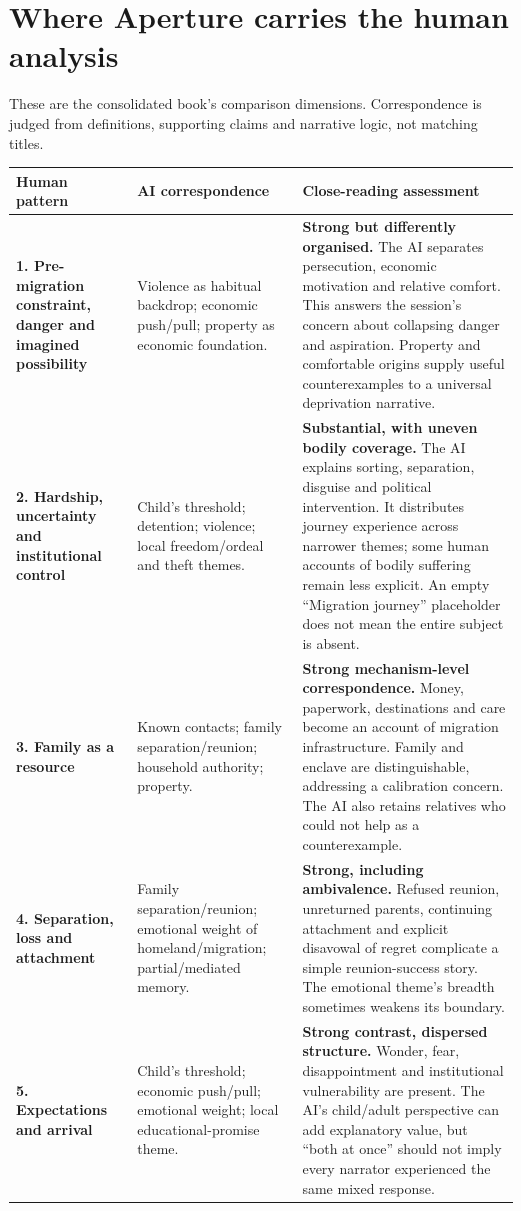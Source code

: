 \documentclass[10pt,a4paper]{article}
\newcommand{\kicker}[1]{{\sffamily\small\bfseries\color{teal}#1}\par\vspace{5pt}}
\newcommand{\page}[2]{\clearpage\kicker{#1}\section*{#2}}
\begin{document}
\page{06 / CANDIDATE PATTERNS, 1--5}{Where Aperture carries the human analysis}
{\small These are the consolidated book's comparison dimensions. Correspondence is judged from definitions, supporting claims and narrative logic, not matching titles.}\par
\begin{tabularx}{\linewidth}{@{}p{3.4cm}YY@{}}
\toprule
\textbf{Human pattern} & \textbf{AI correspondence} & \textbf{Close-reading assessment}\tabularnewline\midrule
\textbf{1. Pre-migration constraint, danger and imagined possibility} & Violence as habitual backdrop; economic push/pull; property as economic foundation. & \textbf{Strong but differently organised.} The AI separates persecution, economic motivation and relative comfort. This answers the session's concern about collapsing danger and aspiration. Property and comfortable origins supply useful counterexamples to a universal deprivation narrative.\tabularnewline\addlinespace
\textbf{2. Hardship, uncertainty and institutional control} & Child's threshold; detention; violence; local freedom/ordeal and theft themes. & \textbf{Substantial, with uneven bodily coverage.} The AI explains sorting, separation, disguise and political intervention. It distributes journey experience across narrower themes; some human accounts of bodily suffering remain less explicit. An empty ``Migration journey'' placeholder does not mean the entire subject is absent.\tabularnewline\addlinespace
\textbf{3. Family as a resource} & Known contacts; family separation/reunion; household authority; property. & \textbf{Strong mechanism-level correspondence.} Money, paperwork, destinations and care become an account of migration infrastructure. Family and enclave are distinguishable, addressing a calibration concern. The AI also retains relatives who could not help as a counterexample.\tabularnewline\addlinespace
\textbf{4. Separation, loss and attachment} & Family separation/reunion; emotional weight of homeland/migration; partial/mediated memory. & \textbf{Strong, including ambivalence.} Refused reunion, unreturned parents, continuing attachment and explicit disavowal of regret complicate a simple reunion-success story. The emotional theme's breadth sometimes weakens its boundary.\tabularnewline\addlinespace
\textbf{5. Expectations and arrival} & Child's threshold; economic push/pull; emotional weight; local educational-promise theme. & \textbf{Strong contrast, dispersed structure.} Wonder, fear, disappointment and institutional vulnerability are present. The AI's child/adult perspective can add explanatory value, but ``both at once'' should not imply every narrator experienced the same mixed response.\tabularnewline\bottomrule
\end{tabularx}
\end{document}
